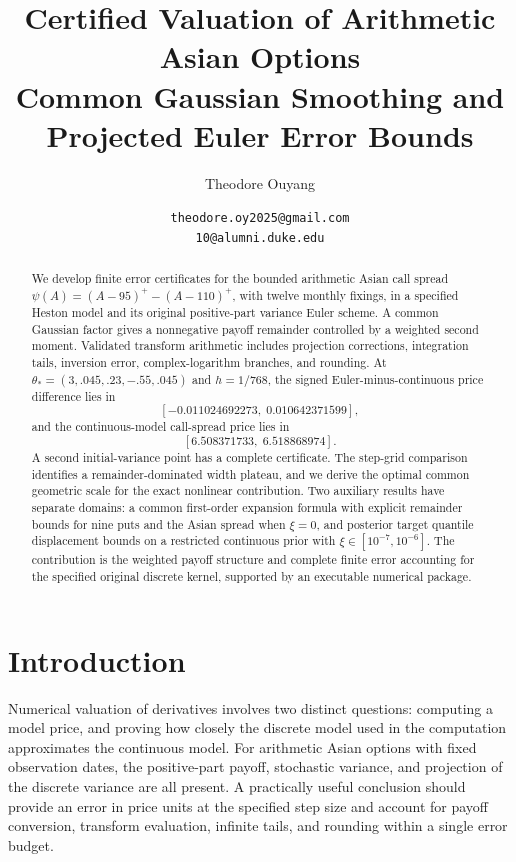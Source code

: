 \documentclass[11pt,a4paper]{article}
\title{Certified Valuation of Arithmetic Asian Options\\[6pt]\small Common Gaussian Smoothing and Projected Euler Error Bounds}
\author{Theodore Ouyang}
\date{\small\texttt{theodore.oy2025@gmail.com}\\\texttt{10@alumni.duke.edu}}
\begin{document}
\maketitle
\tableofcontents
\clearpage
\begin{abstract}
We develop finite error certificates for the bounded arithmetic Asian call spread
\(\psi(A)=(A-95)^+-(A-110)^+\), with twelve monthly fixings, in a specified Heston
model and its original positive-part variance Euler scheme. A common Gaussian
factor gives a nonnegative payoff remainder controlled by a weighted second
moment. Validated transform arithmetic includes projection corrections, integration
tails, inversion error, complex-logarithm branches, and rounding. At
\(\theta_*=(3,.045,.23,-.55,.045)\) and \(h=1/768\), the signed
Euler-minus-continuous price difference lies in
\[
[-0.011024692273,\;0.010642371599],
\]
and the continuous-model call-spread price lies in
\[
[6.508371733,\;6.518868974].
\]
A second initial-variance point has a complete certificate. The step-grid
comparison identifies a remainder-dominated width plateau, and
we derive the optimal common geometric scale for the exact nonlinear contribution.
Two auxiliary results have separate domains: a common first-order expansion
formula with explicit remainder bounds for nine puts and the Asian spread when
\(\xi=0\), and posterior target quantile displacement bounds on a restricted
continuous prior with \(\xi\in[10^{-7},10^{-6}]\). The contribution is the
weighted payoff structure and complete finite error accounting for the specified
original discrete kernel, supported by an executable numerical package.
\end{abstract}

\section{Introduction}

Numerical valuation of derivatives involves two distinct questions: computing a model price, and proving how closely the discrete model used in the computation approximates the continuous model. For arithmetic Asian options with fixed observation dates, the positive-part payoff, stochastic variance, and projection of the discrete variance are all present. A practically useful conclusion should provide an error in price units at the specified step size and account for payoff conversion, transform evaluation, infinite tails, and rounding within a single error budget.
\end{document}
